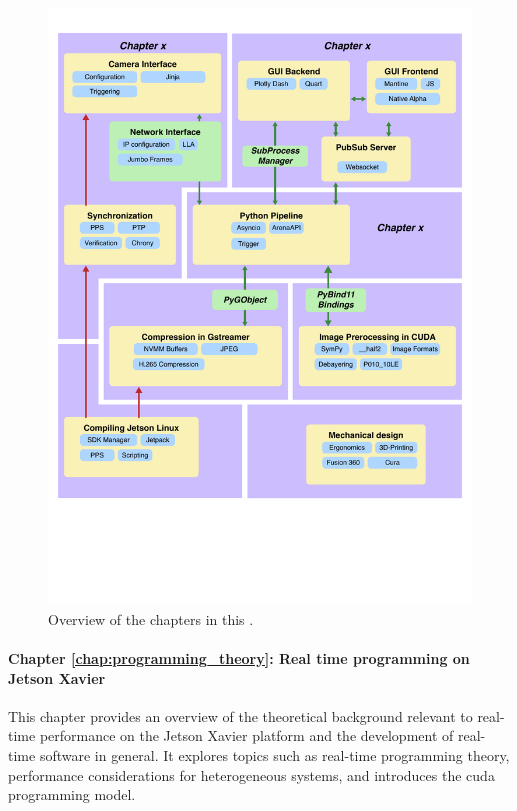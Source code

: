 \begin{figure}[H]
    \includegraphics[width=\textwidth]{chapters/10_intro/chapter_overview.pdf}
    \caption{Overview of the chapters in this \master.}
    \label{fig:overview}
\end{figure}


\paragraph{Chapter \ref{chap:programming_theory}: Real time programming on Jetson Xavier}
This chapter provides an overview of the theoretical background relevant to real-time performance on the Jetson Xavier platform and the development of real-time software in general.
It explores topics such as real-time programming theory, performance considerations for heterogeneous systems, and introduces the \gls{cuda} programming model.

